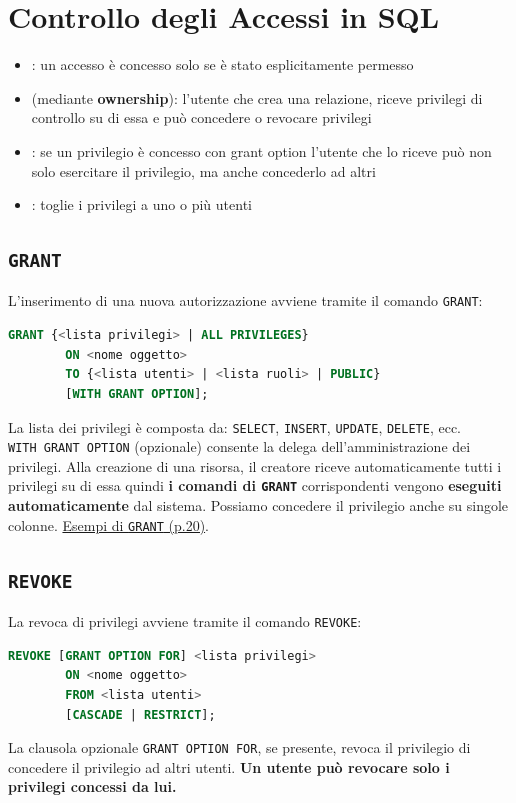 \documentclass[12pt, a4paper]{report}
\begin{document}
    \section{Controllo degli Accessi in SQL}
    \begin{itemize}
        \item {}: un accesso è concesso solo se è stato esplicitamente permesso
        \item {} (mediante \textbf{ownership}): l'utente che crea una relazione, riceve privilegi di controllo su di essa e può concedere o revocare privilegi
        \item {}: se un privilegio è concesso con grant option l'utente che lo riceve può non solo esercitare il privilegio, ma anche concederlo ad altri
        \item {}: toglie i privilegi a uno o più utenti
    \end{itemize}
    \subsection{\texttt{GRANT}}
    L'inserimento di una nuova autorizzazione avviene tramite il comando \texttt{GRANT}:
    \begin{lstlisting}[language=SQL]
        GRANT {<lista privilegi> | ALL PRIVILEGES}
        ON <nome oggetto>
        TO {<lista utenti> | <lista ruoli> | PUBLIC}
        [WITH GRANT OPTION];
    \end{lstlisting}
    La lista dei privilegi è composta da: \texttt{SELECT}, \texttt{INSERT}, \texttt{UPDATE}, \texttt{DELETE}, ecc.\\ 
    \texttt{WITH GRANT OPTION} (opzionale) consente la delega dell'amministrazione dei privilegi.
    Alla creazione di una risorsa, il creatore riceve automaticamente tutti i privilegi su di essa quindi \textbf{i comandi di \texttt{GRANT}} corrispondenti vengono \textbf{eseguiti automaticamente} dal sistema.
    Possiamo concedere il privilegio anche su singole colonne.
    \href{https://2023.aulaweb.unige.it/pluginfile.php/352748/mod_resource/content/4/03A-controlloAccesso-23-24.pdf}{Esempi di \texttt{GRANT} (p.20)}.
    \subsection{\texttt{REVOKE}}
    La revoca di privilegi avviene tramite il comando \texttt{REVOKE}:
    \begin{lstlisting}[language=SQL]
        REVOKE [GRANT OPTION FOR] <lista privilegi>
        ON <nome oggetto>
        FROM <lista utenti>
        [CASCADE | RESTRICT];
    \end{lstlisting}
    La clausola opzionale \texttt{GRANT OPTION FOR}, se presente, revoca il privilegio di concedere il privilegio ad altri utenti. \textbf{Un utente può revocare solo i privilegi concessi da lui.}
\end{document}
